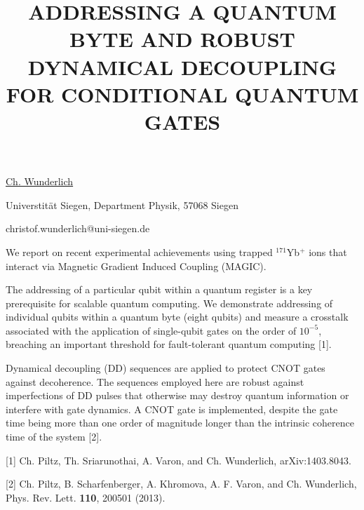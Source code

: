 \title{ADDRESSING A QUANTUM BYTE AND ROBUST DYNAMICAL DECOUPLING FOR CONDITIONAL QUANTUM GATES}

\underline{Ch. Wunderlich} 

{\normalsize{\vspace{-4mm}
Universtit\"{a}t Siegen,
Department Physik,
57068 Siegen

\email christof.wunderlich@uni-siegen.de}}

We report on recent experimental achievements using trapped $^{171}$Yb$^+$ ions that interact via Magnetic Gradient Induced Coupling (MAGIC).

The addressing of a particular qubit within a quantum register is a key prerequisite for scalable
quantum computing. We demonstrate addressing of individual qubits within a quantum byte
(eight qubits) and measure a crosstalk associated with the application of single-qubit gates on the
order of $10^{-5}$, breaching an important threshold for fault-tolerant quantum computing [1].

Dynamical decoupling (DD) sequences are applied to protect CNOT gates against decoherence. The sequences  employed here are robust against imperfections of DD pulses that
otherwise may destroy quantum information or interfere with gate dynamics.
A CNOT gate is implemented, despite the gate time being more
than one order of magnitude longer than the intrinsic coherence time of the
system [2].

{\normalsize
[1] Ch. Piltz, Th. Sriarunothai, A. Varon, and Ch. Wunderlich, arXiv:1403.8043.
\vsp

[2] Ch. Piltz, B. Scharfenberger, A. Khromova, A. F. Varon, and Ch. Wunderlich, Phys. Rev. Lett. {\bf 110}, 200501 (2013).
}

\vspace{\baselineskip}
